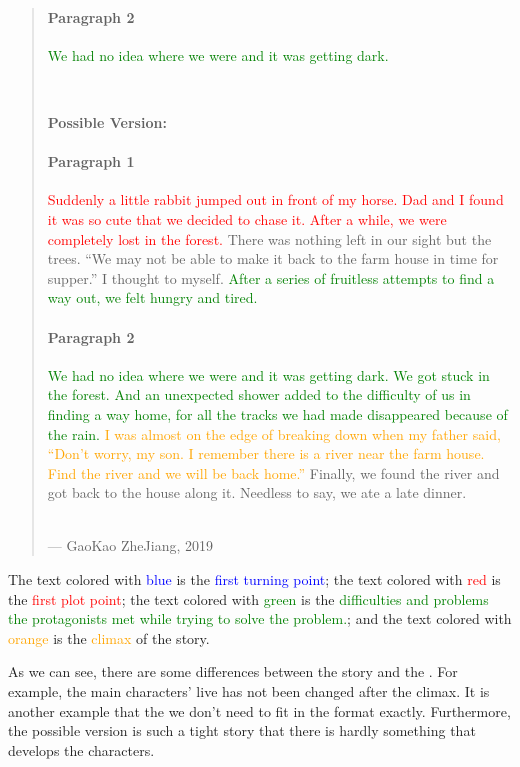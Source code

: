 \begin{quotation}
{\paragraph{Paragraph 2}
\textcolor{green}{We had no idea where we were and it was getting dark.}
}\\
\begin{large}
\textbf{Possible Version:}
\end{large}

{
\sffamily
\paragraph{Paragraph 1}
\textcolor{red}{Suddenly a little rabbit jumped out in front of my horse. Dad and 
I found it was so cute that we decided to chase it. After a while, we were 
completely lost in the forest.} There was nothing left in our sight but the 
trees. ``We may not be able to make it back to the farm house in time for 
supper.'' I thought to myself. \textcolor{green}{After a series of fruitless 
attempts to find a way out, we felt hungry and tired.}

\paragraph{Paragraph 2}
\textcolor{green}{We had no idea where we were and it was getting dark. We got 
stuck in the forest. And an unexpected shower added to the difficulty of us in 
finding a way home, for all the tracks we had made disappeared because of the 
rain.} \textcolor{orange}{I was almost on the edge of breaking down when my 
father said, ``Don't worry, my son. I remember there is a river near the farm 
house. Find the river and we will be back home.''} Finally, we found the river 
and got back to the house along it. Needless to say, we ate a late dinner.}
\\
--- GaoKao ZheJiang, 2019
\end{quotation}

The text colored with \textcolor{blue}{blue} is the \textcolor{blue}{first 
turning point}; the text colored with \textcolor{red}{red} is the \textcolor{red}
{first plot point}; the text colored with \textcolor{green}{green} is the 
\textcolor{green}{difficulties and problems the protagonists met while trying to 
solve the problem.}; and the text colored with \textcolor{orange}{orange} is the 
\textcolor{orange}{climax} of the story.

As we can see, there are some differences between the story and the \TriActStruct 
. For example, the main characters' live has not been changed after the climax. 
It is another example that the we don't need to fit in the format exactly. 
Furthermore, the possible version is such a tight story that there is hardly
something that develops the characters.

